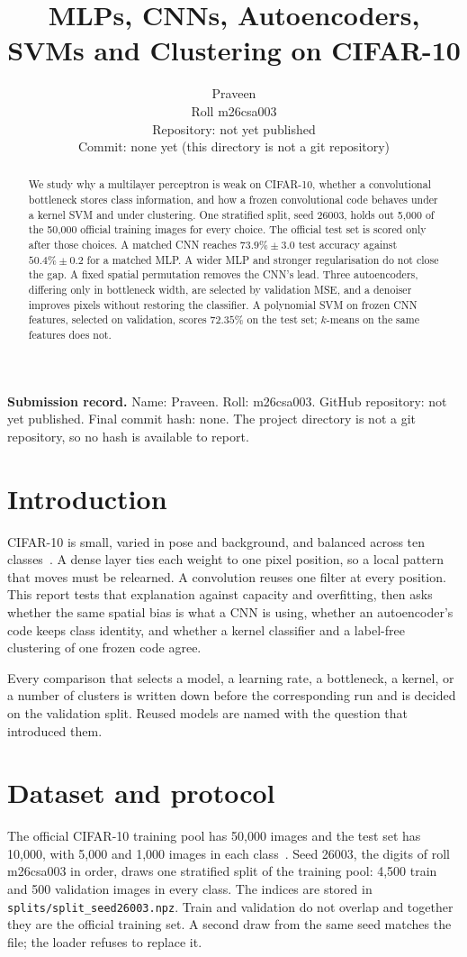 \documentclass[10pt,twocolumn,letterpaper]{article}
\title{MLPs, CNNs, Autoencoders, SVMs and Clustering on CIFAR-10}
\author{Praveen\\
Roll m26csa003\\
Repository: not yet published\\
Commit: none yet (this directory is not a git repository)}
\begin{document}
\maketitle

\begin{abstract}
We study why a multilayer perceptron is weak on CIFAR-10, whether a convolutional bottleneck stores class information, and how a frozen convolutional code behaves under a kernel SVM and under clustering. One stratified split, seed 26003, holds out 5{,}000 of the 50{,}000 official training images for every choice. The official test set is scored only after those choices. A matched CNN reaches $73.9\%{\pm}3.0$ test accuracy against $50.4\%{\pm}0.2$ for a matched MLP. A wider MLP and stronger regularisation do not close the gap. A fixed spatial permutation removes the CNN's lead. Three autoencoders, differing only in bottleneck width, are selected by validation MSE, and a denoiser improves pixels without restoring the classifier. A polynomial SVM on frozen CNN features, selected on validation, scores $72.35\%$ on the test set; $k$-means on the same features does not.
\end{abstract}

\noindent\textbf{Submission record.}
Name: Praveen.
Roll: m26csa003.
GitHub repository: not yet published.
Final commit hash: none. The project directory is not a git repository, so no hash is available to report.

\section{Introduction}
CIFAR-10 is small, varied in pose and background, and balanced across ten classes~\cite{krizhevsky2009cifar}. A dense layer ties each weight to one pixel position, so a local pattern that moves must be relearned. A convolution reuses one filter at every position. This report tests that explanation against capacity and overfitting, then asks whether the same spatial bias is what a CNN is using, whether an autoencoder's code keeps class identity, and whether a kernel classifier and a label-free clustering of one frozen code agree.

Every comparison that selects a model, a learning rate, a bottleneck, a kernel, or a number of clusters is written down before the corresponding run and is decided on the validation split. Reused models are named with the question that introduced them.

\section{Dataset and protocol}
The official CIFAR-10 training pool has 50{,}000 images and the test set has 10{,}000, with 5{,}000 and 1{,}000 images in each class~\cite{krizhevsky2009cifar}. Seed 26003, the digits of roll m26csa003 in order, draws one stratified split of the training pool: 4{,}500 train and 500 validation images in every class. The indices are stored in \texttt{splits/split\_seed26003.npz}. Train and validation do not overlap and together they are the official training set. A second draw from the same seed matches the file; the loader refuses to replace it.
\end{document}
